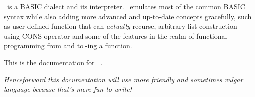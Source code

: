 \tbas\ is a BASIC dialect and its interpreter. \tbas\ emulates most of the common BASIC syntax while also adding more advanced and up-to-date concepts gracefully, such as user-defined function that can \emph{actually} recurse, arbitrary list construction using CONS-operator and some of the features in the realm of functional programming from  and  to -ing a function.

This is the documentation for \tbas\ \tbasver.

\vfill

\small\emph{Henceforward this documentation will use more friendly and sometimes vulgar language because that's more fun to write!}
